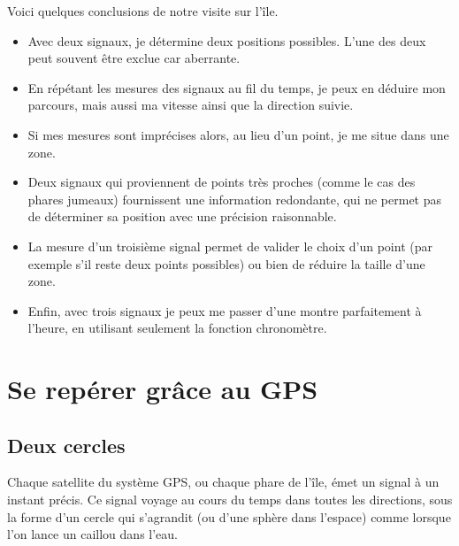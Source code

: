 \documentclass[class=report,crop=false]{standalone}
\begin{document}
Voici quelques conclusions de notre visite sur l'île.

\begin{itemize}
  \item  Avec deux signaux, je détermine deux positions possibles. L'une des deux peut souvent
  être exclue car aberrante.
  
  \item En répétant les mesures des signaux au fil du temps, je peux en déduire
  mon parcours, mais aussi ma vitesse ainsi que la direction suivie.
  
  \item Si mes mesures sont imprécises alors, au lieu d'un point, je me situe dans une zone.
  
  \item Deux signaux qui proviennent de points très proches (comme le cas des phares jumeaux) 
  fournissent une information redondante, qui ne permet pas de déterminer sa position avec une précision raisonnable.
    
  \item La mesure d'un troisième signal permet de valider le choix d'un point (par exemple s'il reste deux points possibles)
  ou bien de réduire la taille d'une zone.
  
  \item Enfin, avec trois signaux je peux me passer d'une montre parfaitement à l'heure, 
  en utilisant seulement la fonction chronomètre.

  
\end{itemize}



\section{Se repérer grâce au GPS}

\subsection{Deux cercles}

Chaque satellite du système GPS, ou chaque phare de l'île, émet un signal à un instant précis.
Ce signal voyage  au cours du temps dans toutes les directions, 
sous la forme d'un cercle qui s'agrandit (ou d'une sphère dans l'espace)
comme lorsque l'on lance un caillou dans l'eau.

\end{document}
